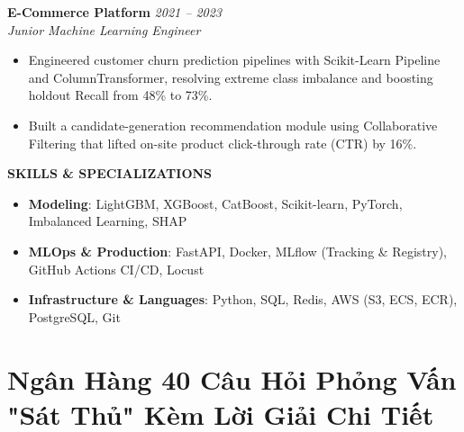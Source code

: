 \begin{samplecvbox}
\textbf{E-Commerce Platform} \hfill \textit{2021 -- 2023}\\
\textit{Junior Machine Learning Engineer}
\begin{itemize}[leftmargin=12pt, nosep]
    \item Engineered customer churn prediction pipelines with Scikit-Learn Pipeline and ColumnTransformer, resolving extreme class imbalance and boosting holdout Recall from 48\% to 73\%.
    \item Built a candidate-generation recommendation module using Collaborative Filtering that lifted on-site product click-through rate (CTR) by 16\%.
\end{itemize}\vspace{6pt}

\textbf{\large SKILLS \& SPECIALIZATIONS}
\begin{itemize}[leftmargin=12pt, nosep]
    \item \textbf{Modeling}: LightGBM, XGBoost, CatBoost, Scikit-learn, PyTorch, Imbalanced Learning, SHAP
    \item \textbf{MLOps \& Production}: FastAPI, Docker, MLflow (Tracking \& Registry), GitHub Actions CI/CD, Locust
    \item \textbf{Infrastructure \& Languages}: Python, SQL, Redis, AWS (S3, ECS, ECR), PostgreSQL, Git
\end{itemize}
\end{samplecvbox}

\section{Ngân Hàng 40 Câu Hỏi Phỏng Vấn "Sát Thủ" Kèm Lời Giải Chi Tiết}

